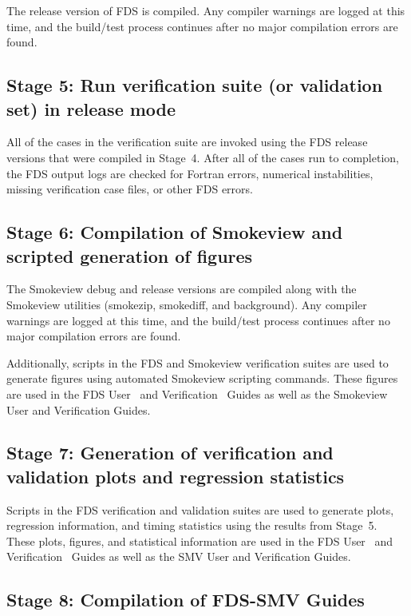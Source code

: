 \documentclass[11pt]{book}
\begin{document}
The release version of FDS is compiled. Any compiler warnings are logged at this time, and the build/test process continues after no major compilation errors are found.

\subsection*{Stage 5: Run verification suite (or validation set) in release mode}

All of the cases in the verification suite are invoked using the FDS release versions that were compiled in Stage~4. After all of the cases run to completion, the FDS output logs are checked for Fortran errors, numerical instabilities, missing verification case files, or other FDS errors.

\subsection*{Stage 6: Compilation of Smokeview and scripted generation of figures}

The Smokeview debug and release versions are compiled along with the Smokeview utilities (smokezip, smokediff, and background). Any compiler warnings are logged at this time, and the build/test process continues after no major compilation errors are found.

Additionally, scripts in the FDS and Smokeview verification suites are used to generate figures using automated Smokeview scripting commands. These figures are used in the FDS User~\cite{FDS_Users_Guide} and Verification~\cite{FDS_Verification_Guide} Guides as well as the Smokeview User and Verification Guides.

\subsection*{Stage 7: Generation of verification and validation plots and regression statistics}

Scripts in the FDS verification and validation suites are used to generate plots, regression information, and timing statistics using the results from Stage~5. These plots, figures, and statistical information are used in the FDS User~\cite{FDS_Users_Guide} and Verification~\cite{FDS_Verification_Guide} Guides as well as the SMV User and Verification Guides.

\subsection*{Stage 8: Compilation of FDS-SMV Guides}
\end{document}
